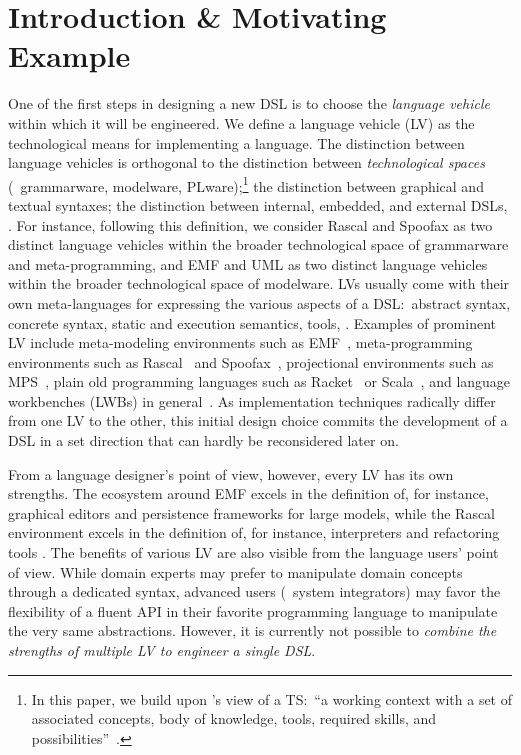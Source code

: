 \section{Introduction \& Motivating Example}
One of the first steps in designing a new DSL is to choose the \emph{language vehicle} within which it will be engineered.
We define a language vehicle (LV) as the technological means for implementing a language.
The distinction between language vehicles is orthogonal to the distinction between \emph{technological spaces} (\eg~grammarware, modelware, PLware);\footnote{In this paper, we build upon \citeauthor{kurtev2002technological}'s view of a TS:~``a working context with a set of associated concepts, body of knowledge, tools, required skills, and possibilities''~\cite{kurtev2002technological}.} the distinction between graphical and textual syntaxes; the distinction between internal, embedded, and external DSLs, \etc.
For instance, following this definition, we consider Rascal and Spoofax as two distinct language vehicles within the broader technological space of grammarware and meta-programming, and EMF and UML as two distinct language vehicles within the broader technological space of modelware.
LVs usually come with their own meta-languages for expressing the various aspects of a DSL:~abstract syntax, concrete syntax, static and execution semantics, tools, \etc.
Examples of prominent LV include meta-modeling environments such as EMF~\cite{steinberg2008emf}, meta-programming environments such as Rascal~\cite{klint2010easy} and Spoofax~\cite{kats2010spoofax}, projectional environments such as MPS~\cite{voelter2013language}, plain old programming languages such as Racket~\cite{felleisen2018programmable} or Scala~\cite{hofer2010modular}, and language workbenches (LWBs) in general~\cite{erdweg2015evaluating}.
As implementation techniques radically differ from one LV to the other, this initial design choice commits the development of a DSL in a set direction that can hardly be reconsidered later on.

From a language designer's point of view, however, every LV has its own strengths.
The ecosystem around EMF excels in the definition of, for instance, graphical editors and persistence frameworks for large models, while the Rascal environment excels in the definition of, for instance, interpreters and refactoring tools .
The benefits of various LV are also visible from the language users' point of view.
While domain experts may prefer to manipulate domain concepts through a dedicated syntax, advanced users (\eg~system integrators) may favor the flexibility of a fluent API in their favorite programming language to manipulate the very same abstractions.
However, it is currently not possible to \emph{combine the strengths of multiple LV to engineer a single DSL}.


